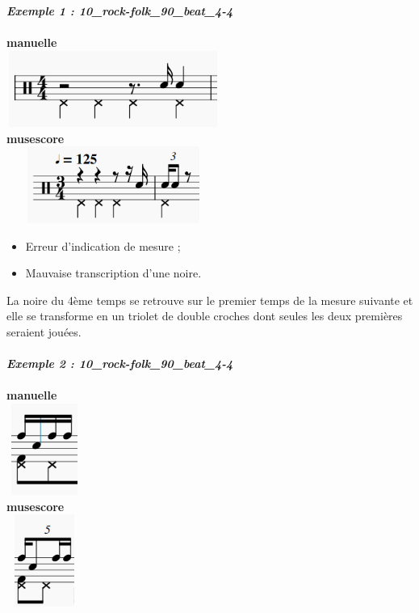 \textbf{\textit{Exemple 1 : 10\_rock-folk\_90\_beat\_4-4}}\\\\
\textbf{manuelle}\\
\includegraphics[height=25mm, width=70mm]{images/transcriptions_manuelles/0_prise_en_main/0_tests_drummer_01__session3/manuel_0.png} \\
\textbf{musescore}\\
\includegraphics[height=25mm, width=70mm]{images/transcriptions_manuelles/0_prise_en_main/0_tests_drummer_01__session3/musescore_0.png} \\
\begin{itemize}
	\item Erreur d’indication de mesure ;
	\item Mauvaise transcription d’une noire.\\
\end{itemize}
La noire du 4ème temps se retrouve sur le premier temps de la mesure suivante et elle se transforme en un triolet de double croches dont seules les deux premières seraient jouées.\\\\
\textbf{\textit{Exemple 2 : 10\_rock-folk\_90\_beat\_4-4}}\\\\
\textbf{manuelle}\\
\includegraphics[height=30mm, width=25mm]{images/transcriptions_manuelles/0_prise_en_main/0_tests_drummer_01__session3/manuel_1.png} \\
\textbf{musescore}\\
\includegraphics[height=30mm, width=25mm]{images/transcriptions_manuelles/0_prise_en_main/0_tests_drummer_01__session3/musescore_1.png} \\
